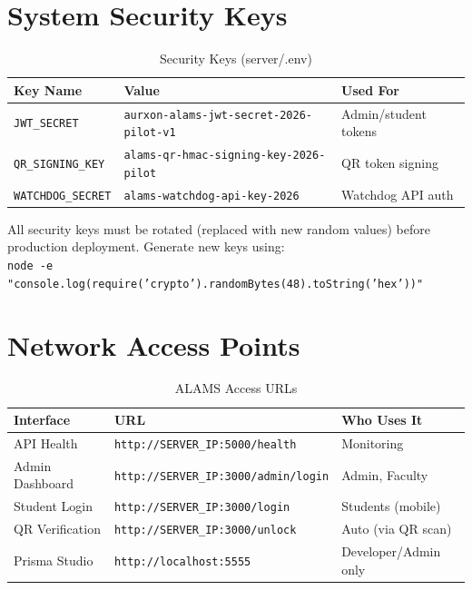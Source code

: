 \section{System Security Keys}

\begin{table}[h!]
\centering
\caption{Security Keys (server/.env)}
\begin{tabularx}{\textwidth}{lXl}
\toprule
\textbf{Key Name} & \textbf{Value} & \textbf{Used For}\\
\midrule
\texttt{JWT\_SECRET} & \texttt{aurxon-alams-jwt-secret-2026-pilot-v1} & Admin/student tokens\\
\rowcolor{aurxonlightgray}
\texttt{QR\_SIGNING\_KEY} & \texttt{alams-qr-hmac-signing-key-2026-pilot} & QR token signing\\
\texttt{WATCHDOG\_SECRET} & \texttt{alams-watchdog-api-key-2026} & Watchdog API auth\\
\bottomrule
\end{tabularx}
\end{table}

\begin{tcolorbox}[warningbox, title={\faExclamationTriangle\quad Key Rotation Policy}]
All security keys must be rotated (replaced with new random values) before production deployment. Generate new keys using:\\
\texttt{node -e "console.log(require('crypto').randomBytes(48).toString('hex'))"}
\end{tcolorbox}

\section{Network Access Points}

\begin{table}[h!]
\centering
\caption{ALAMS Access URLs}
\begin{tabularx}{\textwidth}{lXl}
\toprule
\textbf{Interface} & \textbf{URL} & \textbf{Who Uses It}\\
\midrule
API Health & \texttt{http://SERVER\_IP:5000/health} & Monitoring\\
\rowcolor{aurxonlightgray}
Admin Dashboard & \texttt{http://SERVER\_IP:3000/admin/login} & Admin, Faculty\\
Student Login & \texttt{http://SERVER\_IP:3000/login} & Students (mobile)\\
\rowcolor{aurxonlightgray}
QR Verification & \texttt{http://SERVER\_IP:3000/unlock} & Auto (via QR scan)\\
Prisma Studio & \texttt{http://localhost:5555} & Developer/Admin only\\
\bottomrule
\end{tabularx}
\end{table}
